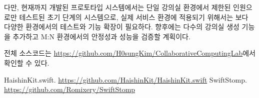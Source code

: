 \documentclass[a4paper]{article}
\begin{document}
다만, 현재까지 개발된 프로토타입 시스템에서는 단일 강의실 환경에서 제한된 인원으로만 테스트된 초기 단계의 시스템으로, 실제 서비스 환경에 적용되기 위해서는 보다 다양한 환경에서의 테스트와 기능 확장이 필요하다. 향후에는 다수의 강의실 생성 기능을 추가하고 M:N 환경에서의 안정성과 성능을 검증할 계획이다.

전체 소스코드는 \href{https://github.com/H0sungKim/CollaborativeComputingLab}{https://github.com/H0sungKim/CollaborativeComputingLab}에서 확인할 수 있다.
\newpage
\begin{thebibliography}{1}
HaishinKit.swift. \href{https://github.com/HaishinKit/HaishinKit.swift}{https://github.com/HaishinKit/HaishinKit.swift}
SwiftStomp. \href{https://github.com/Romixery/SwiftStomp}{https://github.com/Romixery/SwiftStomp}
\end{thebibliography}
\end{document}
